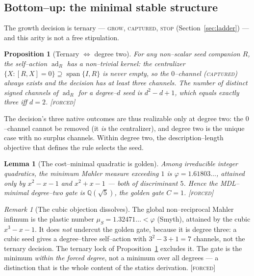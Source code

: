 \documentclass[11pt]{article}
\theoremstyle{plain}
\newtheorem{proposition}[theorem]{Proposition}
\newtheorem{lemma}[theorem]{Lemma}
\theoremstyle{definition}
\theoremstyle{remark}
\newtheorem{remark}[theorem]{Remark}
\newcommand{\forced}{\textcolor{forcedc}{\textsc{[forced]}}}
\newcommand{\Q}{\mathbb{Q}}
\begin{document}
\subsection{Bottom--up: the minimal stable structure}\label{ssec:bottomup}

The growth decision is ternary --- \textsc{grow}, \textsc{captured}, \textsc{stop} (Section~\ref{sec:ladder}) --- and this arity is not a free stipulation.

\begin{proposition}[Ternary $\Leftrightarrow$ degree two]\label{prop:ternary}
For any non--scalar seed companion $R$, the self--action $\operatorname{ad}_R$ has a non--trivial kernel: the centralizer $\{X:[R,X]=0\}\supseteq\operatorname{span}\{I,R\}$ is never empty, so the $0$--channel (\textsc{captured}) always exists and the decision has at least three channels. The number of distinct signed channels of $\operatorname{ad}_R$ for a degree--$d$ seed is $d^2-d+1$, which equals exactly three iff $d=2$. \forced
\end{proposition}

The decision's three native outcomes are thus realizable only at degree two: the $0$--channel cannot be removed (it \emph{is} the centralizer), and degree two is the unique case with no surplus channels. Within degree two, the description--length objective that defines the rule selects the seed.

\begin{lemma}[The cost--minimal quadratic is golden]\label{lem:mincost}
Among irreducible integer quadratics, the minimum Mahler measure exceeding $1$ is $\varphi=1.61803\ldots$, attained \emph{only} by $x^2-x-1$ and $x^2+x-1$ --- both of discriminant $5$. Hence the MDL--minimal degree--two gate is $\Q(\sqrt5)$, the golden gate $C=1$. \forced
\end{lemma}

\begin{remark}[The cubic objection dissolves]\label{rem:cubic}
The global non--reciprocal Mahler infimum is the plastic number $\mu_S=1.32471\ldots<\varphi$ (Smyth), attained by the cubic $x^3-x-1$. It does \emph{not} undercut the golden gate, because it is degree three: a cubic seed gives a degree--three self--action with $3^2-3+1=7$ channels, not the ternary decision. The ternary lock of Proposition~\ref{prop:ternary} excludes it. The gate is the minimum \emph{within the forced degree}, not a minimum over all degrees --- a distinction that is the whole content of the statics derivation. \forced
\end{remark}
\end{document}
